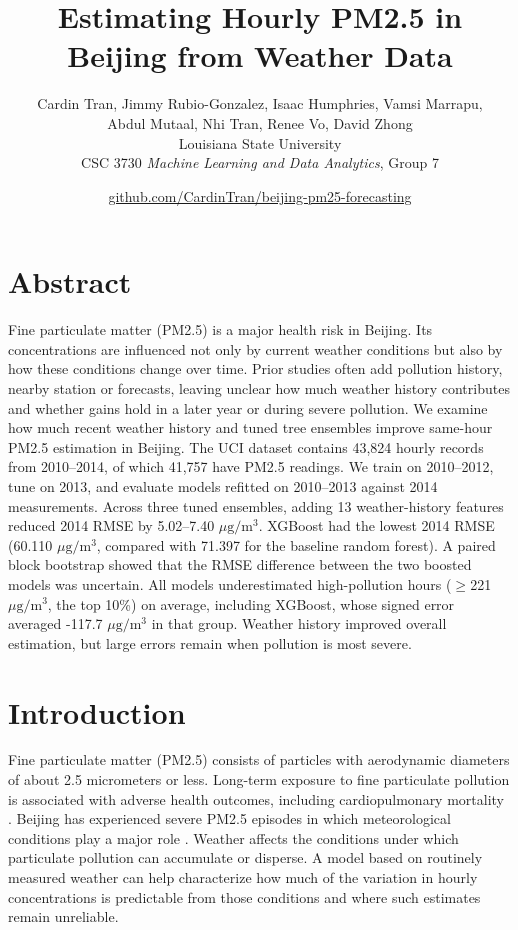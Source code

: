 \documentclass[11pt]{article}
\title{Estimating Hourly PM2.5 in Beijing from Weather Data}
\author{Cardin Tran, Jimmy Rubio-Gonzalez, Isaac Humphries, Vamsi Marrapu,\\
Abdul Mutaal, Nhi Tran, Renee Vo, David Zhong\\[0.6em]
Louisiana State University\\
CSC 3730 \textit{Machine Learning and Data Analytics}, Group 7}
\date{\href{https://github.com/CardinTran/beijing-pm25-forecasting}{github.com/CardinTran/beijing-pm25-forecasting}}
\newcommand{\conc}{\ensuremath{\mu\mathrm{g}/\mathrm{m}^3}}
\begin{document}
\maketitle

\section{Abstract}
Fine particulate matter (PM2.5) is a major health risk in Beijing. Its concentrations are influenced not only by current weather conditions but also by how these conditions change over time. Prior studies often add pollution history, nearby station or forecasts, leaving unclear how much weather history contributes and whether gains hold in a later year or during severe pollution. We examine how much recent weather history and tuned tree ensembles improve same-hour PM2.5 estimation in Beijing. The UCI dataset contains 43,824 hourly records from 2010--2014, of which 41,757 have PM2.5 readings. We train on 2010--2012, tune on 2013, and evaluate models refitted on 2010--2013 against 2014 measurements. Across three tuned ensembles, adding 13 weather-history features reduced 2014 RMSE by 5.02--7.40 \conc{}. XGBoost had the lowest 2014 RMSE (60.110 \conc{}, compared with 71.397 for the baseline random forest). A paired block bootstrap showed that the RMSE difference between the two boosted models was uncertain. All models underestimated high-pollution hours ($\geq$221 \conc{}, the top 10\%) on average, including XGBoost, whose signed error averaged -117.7 \conc{} in that group. Weather history improved overall estimation, but large errors remain when pollution is most severe.

\section{Introduction}
Fine particulate matter (PM2.5) consists of particles with aerodynamic diameters of about 2.5 micrometers or less. Long-term exposure to fine particulate pollution is associated with adverse health outcomes, including cardiopulmonary mortality \citep{pope2002}. Beijing has experienced severe PM2.5 episodes in which meteorological conditions play a major role \citep{liang2015}. Weather affects the conditions under which particulate pollution can accumulate or disperse. A model based on routinely measured weather can help characterize how much of the variation in hourly concentrations is predictable from those conditions and where such estimates remain unreliable.
\end{document}
